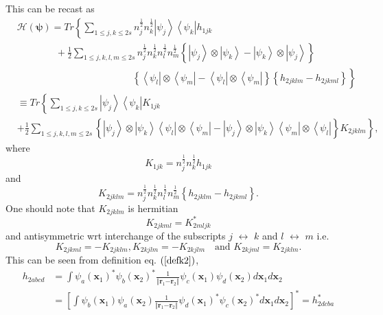 \documentclass[aps,preprint]{revtex4}%
\begin{document}
This can be recast as
\begin{align}
&  \mathcal{H}\left(  \mathbf{\psi}\right)  =Tr\left\{  \sum_{1\leq j,k\leq
2s}n_{j}^{\frac{1}{2}}n_{k}^{\frac{1}{2}}\left\vert \psi_{j}\right\rangle
\left\langle \psi_{k}\right\vert h_{1jk}\right. \nonumber\\
&  \qquad\qquad+\frac{1}{2}\sum_{1\leq j,k,l,m\leq2s}n_{j}^{\frac{1}{2}}%
n_{k}^{\frac{1}{2}}n_{l}^{\frac{1}{2}}n_{m}^{\frac{1}{2}}\left\{  \left\vert
\psi_{j}\right\rangle \otimes\left\vert \psi_{k}\right\rangle -\left\vert
\psi_{k}\right\rangle \otimes\left\vert \psi_{j}\right\rangle \right\}
\nonumber\\
&  \qquad\qquad\qquad\qquad\qquad\qquad\left.  \overset{}{\left\{
\left\langle \psi_{l}\right\vert \otimes\left\langle \psi_{m}\right\vert
-\left\langle \psi_{l}\right\vert \otimes\left\langle \psi_{m}\right\vert
\right\}  \left\{  h_{2jklm}-h_{2jkml}\right\}  }\right\} \nonumber\\
&  \equiv Tr\left\{  \sum_{1\leq j,k\leq2s}\left\vert \psi_{j}\right\rangle
\left\langle \psi_{k}\right\vert K_{1jk}\right. \nonumber\\
&  +\left.  \frac{1}{2}\sum_{1\leq j,k,l,m\leq2s}\left\{  \left\vert \psi
_{j}\right\rangle \otimes\left\vert \psi_{k}\right\rangle \left\langle
\psi_{l}\right\vert \otimes\left\langle \psi_{m}\right\vert -\left\vert
\psi_{j}\right\rangle \otimes\left\vert \psi_{k}\right\rangle \left\langle
\psi_{m}\right\vert \otimes\left\langle \psi_{l}\right\vert \right\}
K_{2jklm}\right\}  ,
\end{align}
where
\begin{equation}
K_{1jk}=n_{j}^{\frac{1}{2}}n_{k}^{\frac{1}{2}}h_{1jk}%
\end{equation}
and
\begin{equation}
K_{2jklm}=n_{j}^{\frac{1}{2}}n_{k}^{\frac{1}{2}}n_{l}^{\frac{1}{2}}%
n_{m}^{\frac{1}{2}}\left\{  h_{2jklm}-h_{2jkml}\right\}  . \label{defk2}%
\end{equation}
One should note that $K_{2jklm}$ is hermitian
\begin{equation}
K_{2jkml}=K_{2mljk}^{\ast}%
\end{equation}
and antisymmetric wrt interchange of the subscripts $j$ $\leftrightarrow$ $k$
and $l$ $\leftrightarrow$ $m$ i.e.
\begin{equation}
K_{2jkml}=-K_{2jklm},K_{2kjlm}=-K_{2kjlm}\quad\text{and }K_{2kjml}=K_{2jklm}.
\end{equation}
This can be seen from definition eq. $\left(  \ref{defk2}\right)  $,
\begin{align}
h_{2abcd}  &  =\int\psi_{a}\left(  \mathbf{x}_{1}\right)  ^{\ast}\psi
_{b}\left(  \mathbf{x}_{2}\right)  ^{\ast}\frac{1}{\left\Vert \mathbf{r}%
_{1}\mathbf{-r}_{2}\right\Vert }\psi_{c}\left(  \mathbf{x}_{1}\right)
\psi_{d}\left(  \mathbf{x}_{2}\right)  d\mathbf{x}_{1}d\mathbf{x}%
_{2}\nonumber\\
&  =\left[  \int\psi_{b}\left(  \mathbf{x}_{1}\right)  \psi_{a}\left(
\mathbf{x}_{2}\right)  \frac{1}{\left\Vert \mathbf{r}_{1}\mathbf{-r}%
_{2}\right\Vert }\psi_{d}\left(  \mathbf{x}_{1}\right)  ^{\ast}\psi_{c}\left(
\mathbf{x}_{2}\right)  ^{\ast}d\mathbf{x}_{1}d\mathbf{x}_{2}\right]  ^{\ast
}=h_{2dcba}^{\ast}%
\end{align}
\end{document}
